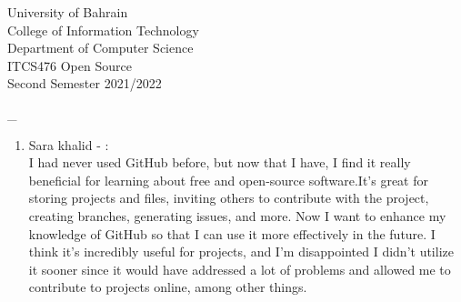 \documentclass[12pt]{article}
\begin{document}
   \begin{enumerate}
   {\Large University of Bahrain}\\
   College of Information Technology\\
   Department of Computer Science\\
   ITCS476 Open Source\\
   Second Semester 2021/2022\\[0.2cm]
 

\bigskip
   \renewcommand{\arraystretch}{1.4}   %
 
 _
   \end{enumerate}

\begin{enumerate}
  \item Sara khalid - :\\
   I had never used GitHub before, but now that I have, I find it really beneficial for learning about free and open-source software.It's great for storing projects and files, inviting others to contribute with the project, creating branches, generating issues, and more. Now I want to enhance my knowledge of GitHub so that I can use it more effectively in the future. I think it's incredibly useful for projects, and I'm disappointed I didn't utilize it sooner since it would have addressed a lot of problems and allowed me to contribute to projects online, among other things.\\
      
\end{enumerate}
\end{document}
